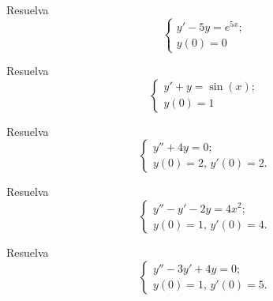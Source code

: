  \begin{resuelto}
  \label{bron:exmp:24.2}
  Resuelva
  $$\begin{cases}
     y'-5y=e^{5x};\\
     y(0)=0
    \end{cases}
$$
 \end{resuelto}




 \begin{resuelto}
  \label{bron:exmp:24.3}
  Resuelva
  $$\begin{cases}
     y'+y=\sin(x);\\
     y(0)=1
    \end{cases}
$$
 \end{resuelto}




 \begin{resuelto}
  \label{bron:exmp:24.4}
  Resuelva
  $$\begin{cases}
     y''+4y=0;\\
     y(0)=2, \, y'(0)=2.
    \end{cases}
$$
 \end{resuelto}




 \begin{resuelto}
  \label{bron:exmp:24.6}
  Resuelva
  $$\begin{cases}
     y''-y'-2y=4x^{2};\\
     y(0)=1, \, y'(0)=4.
    \end{cases}
$$
 \end{resuelto}




 \begin{resuelto}
  \label{bron:exmp:24.5}
  Resuelva
  $$\begin{cases}
     y''-3y'+4y=0;\\
     y(0)=1, \, y'(0)=5.
    \end{cases}
$$
 \end{resuelto}



